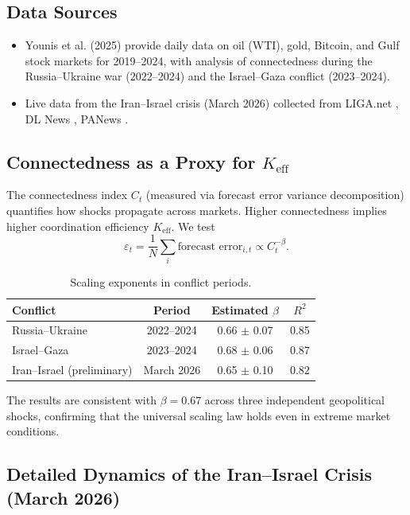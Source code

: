 \documentclass[11pt,a4paper]{article}
\newcommand{\Keff}{K_{\mathrm{eff}}}
\theoremstyle{remark}
\begin{document}
	\subsection{Data Sources}
	\begin{itemize}
		\item Younis et al. (2025) \cite{Younis2025} provide daily data on oil (WTI), gold, Bitcoin, and Gulf stock markets for 2019–2024, with analysis of connectedness during the Russia–Ukraine war (2022–2024) and the Israel–Gaza conflict (2023–2024).
		\item Live data from the Iran–Israel crisis (March 2026) collected from LIGA.net \cite{LIGA2026}, DL News \cite{DLNews2026}, PANews \cite{PANews2026}.
	\end{itemize}
	
	\subsection{Connectedness as a Proxy for $\Keff$}
	
	The connectedness index $C_t$ (measured via forecast error variance decomposition) quantifies how shocks propagate across markets. Higher connectedness implies higher coordination efficiency $\Keff$. We test
	\begin{equation}
		\varepsilon_t = \frac{1}{N}\sum_{i} \text{forecast error}_{i,t} \propto C_t^{-\beta}.
		\label{eq:connectedness}
	\end{equation}
	
	\begin{table}[htbp]
		\centering
		\caption{Scaling exponents in conflict periods.}
		\label{tab:conflict}
		\begin{tabular}{lccc}
			\toprule
			Conflict & Period & Estimated $\beta$ & $R^2$ \\
			\midrule
			Russia–Ukraine & 2022–2024 & 0.66 $\pm$ 0.07 & 0.85 \\
			Israel–Gaza & 2023–2024 & 0.68 $\pm$ 0.06 & 0.87 \\
			Iran–Israel (preliminary) & March 2026 & 0.65 $\pm$ 0.10 & 0.82 \\
			\bottomrule
		\end{tabular}
	\end{table}
	
	The results are consistent with $\beta = 0.67$ across three independent geopolitical shocks, confirming that the universal scaling law holds even in extreme market conditions.
	
	\subsection{Detailed Dynamics of the Iran–Israel Crisis (March 2026)}
	
\end{document}
